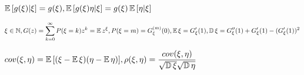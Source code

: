 $\displaystyle \operatorname{\mathbb{E}}{[g(\xi)|\xi]}=g(\xi),
\operatorname{\mathbb{E}}{[g(\xi)\eta|\xi]} = g(\xi)\operatorname{\mathbb{E}}{[\eta|\xi]}$

$\displaystyle \xi\in\mathbb{N},
G(z) = \sum_{k=0}^\infty P(\xi=k)z^k = \operatorname{\mathbb{E}}{z^\xi},
P(\xi = m) = G_\xi^{(m)}(0), \operatorname{\mathbb{E}}{\xi} = G_\xi'(1),
\operatorname{\mathbb{D}}{\xi} = G_\xi''(1) + G_\xi'(1) - (G_\xi'(1))^2$

$\displaystyle cov(\xi, \eta) =
\operatorname{\mathbb{E}}{[(\xi - \operatorname{\mathbb{E}}{\xi})(\eta - \operatorname{\mathbb{E}}{\eta})]},
\rho(\xi, \eta) =
\frac{cov(\xi, \eta)}
{\sqrt{\operatorname{\mathbb{D}}{\xi}}\sqrt{\operatorname{\mathbb{D}}{\eta}}}$

